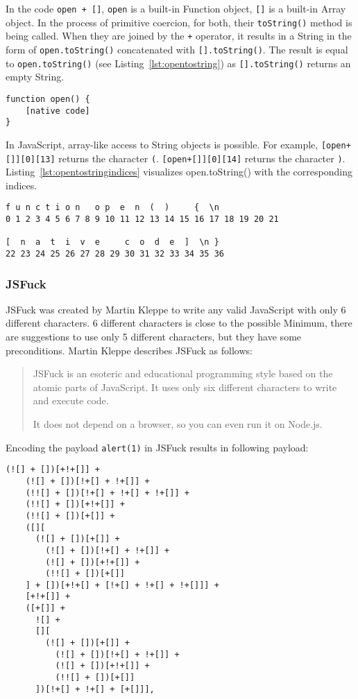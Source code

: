 In the code \verb|open + []|, \verb|open| is a built-in Function object, \verb|[]| is a built-in Array object.
In the process of primitive coercion, for both, their \verb|toString()| method is being called.
When they are joined by the \verb|+| operator, it results in a String in the form of \verb|open.toString()| concatenated with \verb|[].toString()|. The result is equal to \verb|open.toString()| (see Listing~\ref{lst:opentostring}) as \verb|[].toString()| returns an empty String.

\begin{lstlisting}[style=basicStyle, caption=open.toString() in JavaScript, label={lst:opentostring}]
function open() {
    [native code]
}
\end{lstlisting}

In JavaScript, array-like access to String objects is possible. \cite{js/stringbrackets} For example, \verb|[open+[]][0][13]| returns the character \verb|(|. \verb|[open+[]][0][14]| returns the character \verb|)|. Listing~\ref{lst:opentostringindices} visualizes open.toString() with the corresponding indices.

\begin{lstlisting}[style=basicStyle, caption=open.toString() with indices in JavaScript, label={lst:opentostringindices}]
f u n c t i o n   o p  e  n  (  )     {  \n
0 1 2 3 4 5 6 7 8 9 10 11 12 13 14 15 16 17 18 19 20 21

[  n  a  t  i  v  e     c  o  d  e  ]  \n }
22 23 24 25 26 27 28 29 30 31 32 33 34 35 36
\end{lstlisting}


\subsubsection{JSFuck}
\label{sec:jsfuck}
JSFuck was created by Martin Kleppe to write any valid JavaScript with only 6 different characters. 6 different characters is close to the possible Minimum, there are suggestions to use only 5 different characters, but they have some preconditions. \cite{mk/five, tc39/pipeline}
Martin Kleppe describes JSFuck as follows:
\begin{quote}
	JSFuck is an esoteric and educational programming style based on the atomic parts of JavaScript. It uses only six different characters to write and execute code.

	It does not depend on a browser, so you can even run it on Node.js. \cite{mk/jsfuck}
\end{quote}
Encoding the payload \verb|alert(1)| in JSFuck results in following payload:
\begin{lstlisting}[style=basicStyle, caption=alert(1) in JSFuck, label={lst:alert1jsfuck}]
  (![] + [])[+!+[]] +
    (![] + [])[!+[] + !+[]] +
    (!![] + [])[!+[] + !+[] + !+[]] +
    (!![] + [])[+!+[]] +
    (!![] + [])[+[]] +
    ([][
      (![] + [])[+[]] +
        (![] + [])[!+[] + !+[]] +
        (![] + [])[+!+[]] +
        (!![] + [])[+[]]
    ] + [])[+!+[] + [!+[] + !+[] + !+[]]] +
    [+!+[]] +
    ([+[]] +
      ![] +
      [][
        (![] + [])[+[]] +
          (![] + [])[!+[] + !+[]] +
          (![] + [])[+!+[]] +
          (!![] + [])[+[]]
      ])[!+[] + !+[] + [+[]]],
\end{lstlisting}

